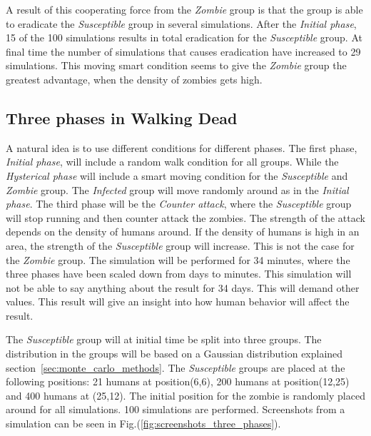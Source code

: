 \documentclass[%
twoside,                 %
final,                   %
chapterprefix=true,      %
open=right               %
10pt]{book}
\begin{document}
A result of this cooperating force from the \emph{Zombie} group is that the group is able to eradicate the \emph{Susceptible} group in several simulations. After the \emph{Initial phase}, 15 of the 100 simulations results in total eradication for the \emph{Susceptible} group. At final time the number of simulations that causes eradication have increased to 29 simulations. This moving smart condition seems to give the \emph{Zombie} group the greatest advantage, when the density of zombies gets high.

\subsection{Three phases in Walking Dead}
A natural idea is to use different conditions for different phases. The first phase, \emph{Initial phase}, will include a random walk condition for all groups. While the \emph{Hysterical phase} will include a smart moving condition for the \emph{Susceptible} and \emph{Zombie} group. The \emph{Infected} group will move randomly around as in the \emph{Initial phase}. The third phase will be the \emph{Counter attack}, where the \emph{Susceptible} group will stop running and then counter attack the zombies. The strength of the attack depends on the density of humans around. If the density of humans is high in an area, the strength of the \emph{Susceptible} group will increase. This is not the case for the \emph{Zombie} group. The simulation will be performed for 34 minutes, where the three phases have been scaled down from days to minutes. This simulation will not be able to say anything about the result for 34 days. This will demand other values. This result will give an insight into how human behavior will affect the result.  


\vspace{3mm}




\vspace{3mm}


The \emph{Susceptible} group will at initial time be split into three groups. The distribution in the groups will be based on a Gaussian distribution explained section~\ref{sec:monte_carlo_methods}. The \emph{Susceptible} groups are placed at the following positions: 21 humans at position(6,6), 200 humans at position(12,25) and 400 humans at (25,12). The initial position for the zombie is randomly placed around for all simulations. 100 simulations are performed. Screenshots from a simulation can be seen in Fig.(\ref{fig:screenshots_three_phases}). 
\end{document}
